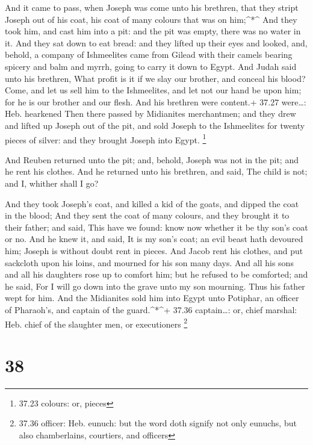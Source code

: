  And it came to pass, when Joseph was come unto his
brethren, that they stript Joseph out of his coat, his coat of many
colours that was on him;\^{}*\^{}  And they took him, and
cast him into a pit: and the pit was empty, there was no water in it.
 And they sat down to eat bread: and they lifted up their
eyes and looked, and, behold, a company of Ishmeelites came from Gilead
with their camels bearing spicery and balm and myrrh, going to carry it
down to Egypt.  And Judah said unto his brethren, What
profit is it if we slay our brother, and conceal his blood?
 Come, and let us sell him to the Ishmeelites, and let not
our hand be upon him; for he is our brother and our flesh. And his
brethren were content.+ 37.27 were\ldots: Heb. hearkened 
Then there passed by Midianites merchantmen; and they drew and lifted up
Joseph out of the pit, and sold Joseph to the Ishmeelites for twenty
pieces of silver: and they brought Joseph into Egypt. \footnote{37.23
  colours: or, pieces}

 And Reuben returned unto the pit; and, behold, Joseph was
not in the pit; and he rent his clothes.  And he returned
unto his brethren, and said, The child is not; and I, whither shall I
go?

 And they took Joseph's coat, and killed a kid of the
goats, and dipped the coat in the blood;  And they sent the
coat of many colours, and they brought it to their father; and said,
This have we found: know now whether it be thy son's coat or no.
 And he knew it, and said, It is my son's coat; an evil
beast hath devoured him; Joseph is without doubt rent in pieces.
 And Jacob rent his clothes, and put sackcloth upon his
loins, and mourned for his son many days.  And all his sons
and all his daughters rose up to comfort him; but he refused to be
comforted; and he said, For I will go down into the grave unto my son
mourning. Thus his father wept for him.  And the Midianites
sold him into Egypt unto Potiphar, an officer of Pharaoh's, and captain
of the guard.\^{}*\^{}+ 37.36 captain\ldots: or, chief marshal: Heb.
chief of the slaughter men, or executioners \footnote{37.36 officer:
  Heb. eunuch: but the word doth signify not only eunuchs, but also
  chamberlains, courtiers, and officers}

\hypertarget{section-37}{%
\section{38}\label{section-37}}

